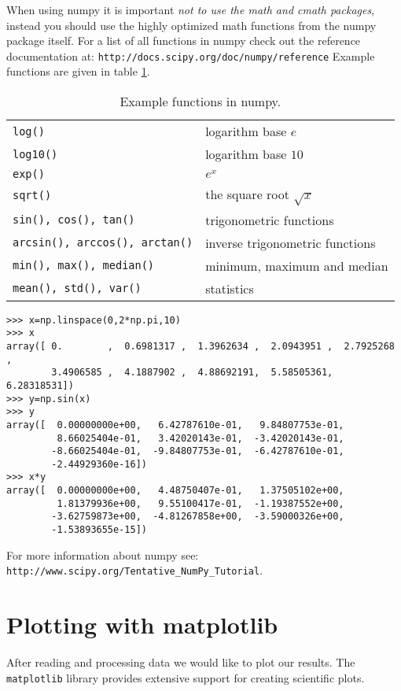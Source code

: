 \documentclass[10pt,a4paper]{article}
\begin{document}
When using numpy it is important \emph{not to use the math and cmath packages}, instead you should use the highly optimized math functions from the numpy package itself.
For a list of all functions in numpy check out the reference documentation at:
\verb|http://docs.scipy.org/doc/numpy/reference|
Example functions are given in table \ref{tb:numpy_functions}.
\begin{table}
\begin{center}
\begin{tabular}{ll}
\verb|log()| & logarithm base $e$\\
\verb|log10()| & logarithm base $10$\\
\verb|exp()| & $e^{x}$\\
\verb|sqrt()| & the square root $\sqrt{x}$\\
\verb|sin(), cos(), tan()| & trigonometric functions\\
\verb|arcsin(), arccos(), arctan()| & inverse trigonometric functions\\
\verb|min(), max(), median()| & minimum, maximum and median\\
\verb|mean(), std(), var()| & statistics
\end{tabular}
\caption{Example functions in numpy.}
\label{tb:numpy_functions}
\end{center}
\end{table}

\begin{lstlisting}
>>> x=np.linspace(0,2*np.pi,10)
>>> x
array([ 0.        ,  0.6981317 ,  1.3962634 ,  2.0943951 ,  2.7925268 ,
        3.4906585 ,  4.1887902 ,  4.88692191,  5.58505361,  6.28318531])
>>> y=np.sin(x)
>>> y
array([  0.00000000e+00,   6.42787610e-01,   9.84807753e-01,
         8.66025404e-01,   3.42020143e-01,  -3.42020143e-01,
        -8.66025404e-01,  -9.84807753e-01,  -6.42787610e-01,
        -2.44929360e-16])
>>> x*y
array([  0.00000000e+00,   4.48750407e-01,   1.37505102e+00,
         1.81379936e+00,   9.55100417e-01,  -1.19387552e+00,
        -3.62759873e+00,  -4.81267858e+00,  -3.59000326e+00,
        -1.53893655e-15])
\end{lstlisting}
For more information about numpy see:\\
\verb|http://www.scipy.org/Tentative_NumPy_Tutorial|.
\section{Plotting with matplotlib}
After reading and processing data we would like to plot our results.
The \verb|matplotlib| library provides extensive support for creating scientific plots.
\end{document}
